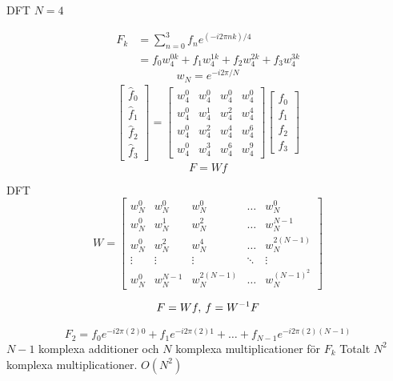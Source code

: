 \documentclass[presentation]{beamer}
\begin{document}
\begin{frame}[label={sec:org7fb99f9}]{DFT}
\(N = 4\)

\begin{align*}
  F_{k} &= \sum_{n=0}^{3} f_{n} e^{(-i2 \pi nk)/4} \\
  &= f_{0}w_{4}^{0k} + f_{1}w_{4}^{1k} + f_{2}w_{4}^{2k} + f_{3}w_{4}^{3k}
\end{align*}
\begin{equation*}
w_{N} = e^{-i2 \pi/N}
\end{equation*}
\pause
\begin{gather*}
  \begin{bmatrix}
    \hat{f}_{0} \\
    \hat{f}_{1} \\
    \hat{f}_{2} \\
    \hat{f}_{3}
    \end{bmatrix}
=
\begin{bmatrix}
  w_{4}^{0} & w_{4}^{0} & w_{4}^{0} & w_{4}^{0} \\
  w_{4}^{0} & w_{4}^{1} & w_{4}^{2} & w_{4}^{4} \\
  w_{4}^{0} & w_{4}^{2} & w_{4}^{4} & w_{4}^{6} \\
  w_{4}^{0} & w_{4}^{3} & w_{4}^{6} & w_{4}^{9}
\end{bmatrix}
  \begin{bmatrix}
    f_{0} \\
    f_{1} \\
    f_{2} \\
    f_{3}
    \end{bmatrix}
\end{gather*}
\begin{equation*}
F = Wf
\end{equation*}
\end{frame}

\begin{frame}[label={sec:orga6f6abd}]{DFT}
\begin{equation*}
W =
\begin{bmatrix}
  w_{N}^{0} & w_{N}^{0} & w_{N}^{0} & \dots & w_{N}^{0} \\
  w_{N}^{0} & w_{N}^{1} & w_{N}^{2} & \dots & w_{N}^{N-1} \\
  w_{N}^{0} & w_{N}^{2} & w_{N}^{4} & \dots & w_{N}^{2(N-1)} \\
  \vdots & \vdots & \vdots       & \ddots & \vdots \\  
  w_{N}^{0} & w_{N}^{N-1} & w_{N}^{2(N-1)} & \dots & w_{N}^{(N-1)^{2}}
\end{bmatrix}
\end{equation*}

\begin{equation*}
F = Wf,  \hspace{0.2em} f = W^{-1}F
\end{equation*}

\begin{equation*}
F_{2} = f_{0}e^{-i2 \pi (2)0} + f_{1}e^{-i2 \pi (2)1} + \dots + f_{N-1}e^{-i2 \pi (2)(N-1)}
\end{equation*}
\(N - 1\) komplexa additioner och \(N\) komplexa multiplicationer för \(F_{k}\)
Totalt \(N^{2}\) komplexa multiplicationer. \(O(N^{2})\)
\end{frame}
\end{document}
